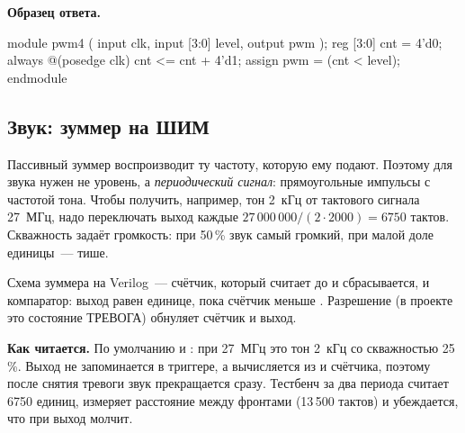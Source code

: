 \textbf{Образец ответа.}
\begin{vcode}
module pwm4 (
    input        clk,
    input  [3:0] level,
    output       pwm
);
    reg [3:0] cnt = 4'd0;
    always @(posedge clk) cnt <= cnt + 4'd1;
    assign pwm = (cnt < level);
endmodule
\end{vcode}


\subsection{Звук: зуммер на ШИМ}

Пассивный зуммер воспроизводит ту частоту, которую ему подают. Поэтому для
звука нужен не уровень, а \emph{периодический сигнал}: прямоугольные
импульсы с частотой тона. Чтобы получить, например, тон 2~кГц от тактового
сигнала 27~МГц, надо переключать выход каждые $27\,000\,000/(2\cdot 2000)
= 6750$ тактов. Скважность задаёт громкость: при 50\,\% звук самый громкий, при
малой доле единицы~--- тише.

Схема зуммера на Verilog~--- счётчик, который считает до  и
сбрасывается, и компаратор: выход равен единице, пока счётчик меньше
. Разрешение  (в проекте это состояние ТРЕВОГА) обнуляет
счётчик и выход.


\textbf{Как читается.} По умолчанию  и :
при 27~МГц это тон 2~кГц со скважностью 25\,\%. Выход  не
запоминается в триггере, а вычисляется из  и счётчика, поэтому после
снятия тревоги звук прекращается сразу. Тестбенч  за два
периода считает 6750 единиц, измеряет расстояние между фронтами (13\,500
тактов) и убеждается, что при  выход молчит.

